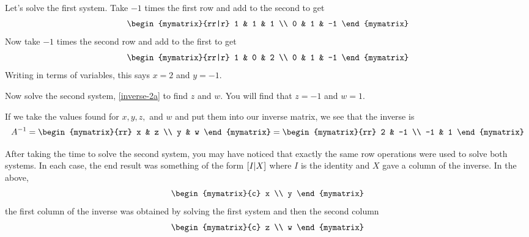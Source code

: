 Let's solve the first system. Take $-1$ times
the first row and add to the second to get
\begin{equation*}
\begin{mymatrix}{rr|r}
1 & 1 & 1 \\
0 & 1 & -1
\end{mymatrix}
\end{equation*}
Now take $-1$ times the second row and add to the first to
get
\begin{equation*}
\begin{mymatrix}{rr|r}
1 & 0 & 2 \\
0 & 1 & -1
\end{mymatrix} 
\end{equation*}
Writing in terms of variables, this says $x=2$ and $y=-1.$

Now solve the second system, \ref{inverse-2a} to find $z$ and $w.$ You will find that 
$z = -1$ and $w = 1$.

If we take the values found for $x,y,z,$ and $w$
 and put them into our inverse matrix, we see that the inverse
is
\begin{equation*}
A^{-1} = 
\begin{mymatrix}{rr}
x & z \\
y & w
\end{mymatrix}
=
\begin{mymatrix}{rr}
2 & -1 \\
-1 & 1
\end{mymatrix} 
\end{equation*}

After taking the time to solve the second system, you may have noticed that exactly the same row
operations were used to solve both systems. In each case, the end result was
something of the form $\left[I|X\right] $ where $I$ is the
identity and $X$ gave a column of the inverse. In the above, 
\begin{equation*}
\begin{mymatrix}{c}
x \\
y
\end{mymatrix}
\end{equation*}
 the first column of the inverse was obtained by solving the first system and then the
second column 
\begin{equation*}
\begin{mymatrix}{c}
z \\
w
\end{mymatrix} 
\end{equation*}

